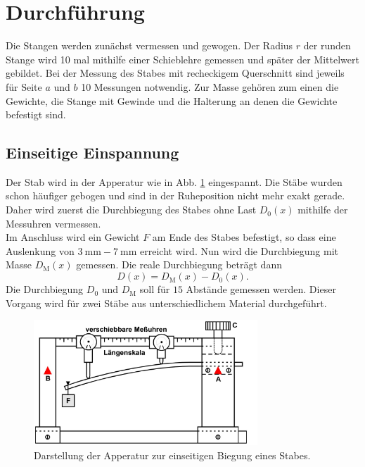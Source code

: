 \section{Durchführung}
\label{sec:Durchführung}
Die Stangen werden zunächst vermessen und gewogen.
Der Radius $r$ der runden Stange wird 10 mal mithilfe einer Schieblehre gemessen und später der Mittelwert gebildet.
Bei der Messung des Stabes mit recheckigem Querschnitt sind jeweils für Seite $a$ und $b$ 10 Messungen notwendig.
Zur Masse gehören zum einen die Gewichte, die Stange mit Gewinde und die Halterung an denen die Gewichte befestigt sind.

\subsection{Einseitige Einspannung}
\label{sec:einseitig}
Der Stab wird in der Apperatur wie in Abb. \ref{fig:apperatur} eingespannt.
Die Stäbe wurden schon häufiger gebogen und sind in der Ruheposition nicht mehr exakt gerade.
Daher wird zuerst die Durchbiegung des Stabes ohne Last $D_0(x)$ mithilfe der Messuhren vermessen.\\
Im Anschluss wird ein Gewicht $F$ am Ende des Stabes befestigt, so dass eine Auslenkung von $\SI{3}{\mm} - \SI{7}{\mm}$ erreicht wird.
Nun wird die Durchbiegung mit Masse $D_\text{M}(x)$ gemessen.
Die reale Durchbiegung beträgt dann
\begin{equation}
    D(x) = D_\text{M}(x) - D_0(x) .
    \label{eqn:D_real}
\end{equation}
Die Durchbiegung $D_0$ und $D_\text{M}$ soll für $15$ Abstände gemessen werden.
Dieser Vorgang wird für zwei Stäbe aus unterschiedlichem Material durchgeführt.
\begin{figure}
    \centering
    \includegraphics[width=0.75\textwidth]{content/data/apperatur.jpg}
    \caption{Darstellung der Apperatur zur einseitigen Biegung eines Stabes. \cite{anleitung}}
    \label{fig:apperatur}
\end{figure}

